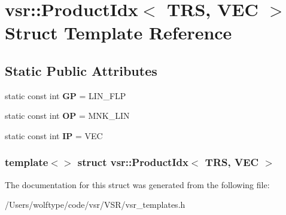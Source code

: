 \hypertarget{structvsr_1_1_product_idx_3_01_t_r_s_00_01_v_e_c_01_4}{\section{vsr\-:\-:Product\-Idx$<$ T\-R\-S, V\-E\-C $>$ Struct Template Reference}
\label{structvsr_1_1_product_idx_3_01_t_r_s_00_01_v_e_c_01_4}
}
\subsection*{Static Public Attributes}
\begin{DoxyCompactItemize}
\item 
\hypertarget{structvsr_1_1_product_idx_3_01_t_r_s_00_01_v_e_c_01_4_a14aa13e456195d69198097b336e3d33c}{static const int {\bfseries G\-P} = L\-I\-N\-\_\-\-F\-L\-P}\label{structvsr_1_1_product_idx_3_01_t_r_s_00_01_v_e_c_01_4_a14aa13e456195d69198097b336e3d33c}

\item 
\hypertarget{structvsr_1_1_product_idx_3_01_t_r_s_00_01_v_e_c_01_4_ae33070e2e29024539199431998ef3784}{static const int {\bfseries O\-P} = M\-N\-K\-\_\-\-L\-I\-N}\label{structvsr_1_1_product_idx_3_01_t_r_s_00_01_v_e_c_01_4_ae33070e2e29024539199431998ef3784}

\item 
\hypertarget{structvsr_1_1_product_idx_3_01_t_r_s_00_01_v_e_c_01_4_aedb32f785754e2660b262037dd2ab4c5}{static const int {\bfseries I\-P} = V\-E\-C}\label{structvsr_1_1_product_idx_3_01_t_r_s_00_01_v_e_c_01_4_aedb32f785754e2660b262037dd2ab4c5}

\end{DoxyCompactItemize}
\subsubsection*{template$<$$>$ struct vsr\-::\-Product\-Idx$<$ T\-R\-S, V\-E\-C $>$}



The documentation for this struct was generated from the following file\-:\begin{DoxyCompactItemize}
\item 
/\-Users/wolftype/code/vsr/\-V\-S\-R/vsr\-\_\-templates.\-h\end{DoxyCompactItemize}
